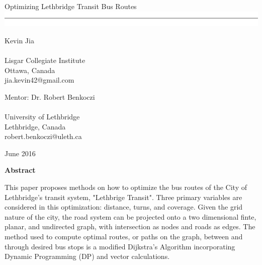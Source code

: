 \documentclass[letter,10pt]{article}
\begin{document}
\vspace*{1cm}
\begin{center} 
\huge
Optimizing Lethbridge Transit Bus Routes
\includegraphics{linebreak}
\vspace*{0.25cm}

\large

\begin{minipage}{0.45\textwidth}
\begin{center}
\vspace*{0.50cm}

Kevin Jia\\
\textcolor{white}{.}\\
Lisgar Collegiate Institute\\
Ottawa, Canada\\
jia.kevin42@gmail.com

\end{center}
\end{minipage}%
\begin{minipage}{0.45\textwidth}
\begin{center}
\vspace*{0.25cm}

Mentor: Dr. Robert Benkoczi\\
\textcolor{white}{.}\\
University of Lethbridge\\
Lethbridge, Canada\\
robert.benkoczi@uleth.ca

\end{center}
\end{minipage}%

\vspace*{1cm}

June 2016

\vspace*{3cm}
\normalsize
\begin{minipage}{0.65\textwidth}
\begin{center}
\textbf{Abstract}\\
\end{center}
This paper proposes methods on how to optimize the bus routes of the City of Lethbridge's transit system, "Lethbrige Transit". Three primary variables are considered in this optimization: distance, turns, and coverage. Given the grid nature of the city, the road system can be projected onto a two dimensional finte, planar, and undirected graph, with intersection as nodes and roads as edges. The method used to compute optimal routes, or paths on the graph, between and through desired bus stops is a modified Dijkstra's Algorithm incorporating Dynamic Programming (DP) and vector calculations. 
\end{minipage}%
\end{center}
\end{document}
